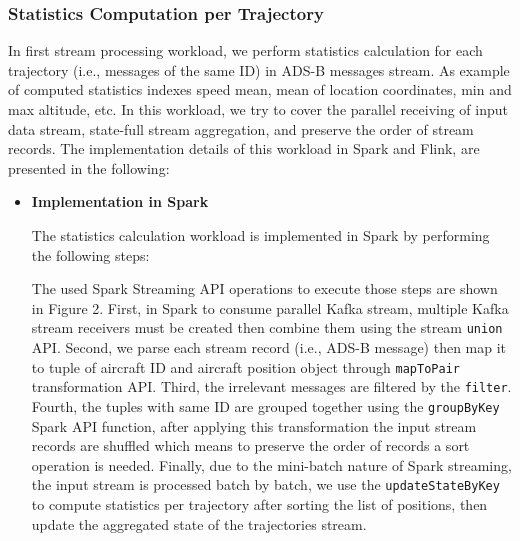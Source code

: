 \documentclass[]{article}
\begin{document}
\subsubsection{Statistics Computation per Trajectory}
In first stream processing workload, we perform statistics calculation for each trajectory (i.e.,  messages of the same ID) in ADS-B messages stream. As example of computed statistics indexes speed mean, mean of location coordinates, min and max altitude, etc. In this workload, we try to cover 
the parallel receiving of input data stream, state-full stream aggregation, and preserve the order of stream records.
The implementation details of this workload in Spark and Flink, are presented in the following: 
\begin{itemize}
\item {\bf{Implementation in Spark }}

The statistics calculation workload is implemented in Spark by performing the following steps: 

\par The used Spark Streaming API operations to execute those steps are shown in Figure 2. First, in Spark to consume parallel Kafka stream, multiple Kafka stream receivers must be created then combine them using the stream \texttt{union} API. Second, we parse each stream record (i.e., ADS-B message) then map it to tuple of aircraft ID and aircraft position object through \texttt{mapToPair} transformation API. Third, the irrelevant messages are filtered by the \texttt{filter}. Fourth, the tuples with same ID are grouped together using the \texttt{groupByKey} Spark API function, after applying this transformation the input stream records are shuffled which means to preserve the order of records a sort operation is needed. Finally, due to the mini-batch nature of Spark streaming, the input stream is processed batch by batch, we use the  \texttt{updateStateByKey} to compute statistics per trajectory after sorting the list of positions, then update the aggregated state of the trajectories stream.


\end{itemize}
\end{document}
